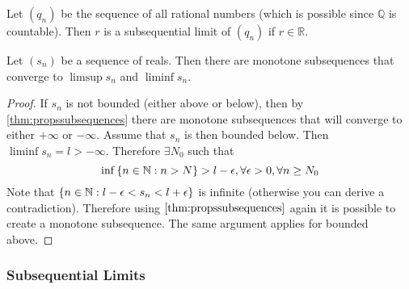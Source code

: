 \documentclass[../notes.tex]{subfiles}
\begin{document}
\begin{example}
    Let $(q_n)$ be the sequence of all rational numbers (which is possible since $\mathbb{Q}$ is countable). Then $r$ is a subsequential limit of $(q_n)$ if $r \in \mathbb{R}$.
\end{example}

\begin{theorem}
    \label{thm:monotonelimsupinf}
    Let $(s_n)$ be a sequence of reals. Then there are monotone subsequences that converge to $\limsup s_n$ and $\liminf s_n$.
\end{theorem}

\begin{proof}
    If $s_n$ is not bounded (either above or below), then by \ref{thm:propssubsequences} there are monotone subsequences that will converge to either $+\infty$ or $-\infty$. Assume that $s_n$ is then bounded below. Then $\liminf s_n = l > -\infty$. Therefore $\exists N_0$ such that
    \[
        \inf\qty{n \in \mathbb{N}: n > N} > l - \epsilon, \forall \epsilon > 0, \forall n \geq N_0
    \]
    Note that $\qty{n \in \mathbb{N} : l - \epsilon < s_n < l + \epsilon}$ is infinite (otherwise you can derive a contradiction). Therefore using $\ref{thm:propssubsequences}$ again it is possible to create a monotone subsequence. The same argument applies for bounded above.
\end{proof}

\subsubsection{Subsequential Limits}
\end{document}
